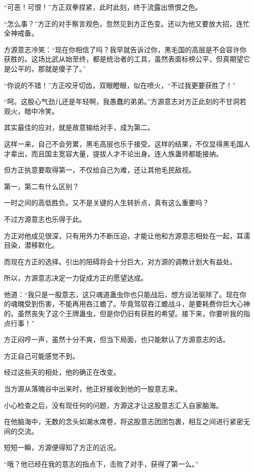\begin{this_body}
“可恶！可恨！”方正双拳捏紧，此时此刻，终于流露出愤恨之色。

“怎么事？”方正的对手察言观色，忽然见到方正色变。还以为他又要放大招，连忙全神戒备。

方源意志冷笑：“现在你相信了吗？我早就告诉过你，黑毛国的高层是不会容许你获胜的。这场比武从始至终，都是统治者的工具，虽然表面标榜公平，但真期望它是公平的，那就是傻子了。”

“你说的不错！”方正咬牙切齿，双眼瞪眼，似在喷火，“不过我更要获胜了！”

“呵。这股心气劲儿还是年轻啊，我愚蠢的弟弟。”方源意志对方正此刻的不甘洞若观火，暗中冷笑。

其实最佳的应对，就是故意输给对手，成为第二。

这样一来，自己不会劳累，黑毛高层也乐于接受。这样的结果，不仅显得黑毛国人才辈出，而且国主宽容大量，提拔人才不论出身。连人族蛊师都能接纳。

但方正执意要取得第一，不仅给自己为难，还让其他毛民敌视。

第一，第二有什么区别？

一时之间的高低胜负。又不是关键的人生转折点，真有这么重要吗？

不过方源意志也乐得于此。

方正对他成见很深，只有用外力不断压迫，才能让他和方源意志相处在一起，耳濡目染，潜移默化。

而现在方正的选择。引出的阻碍将会十分巨大，对方源的调教计划大有益处。

所以，方源意志决定一力促成方正的愿望达成。

他道：“我只是一股意志，这只魂道蛊虫你也只能战后，想方设法驱除了。现在你的魂魄受到伤害，不能再用吞江蟾了。毕竟驾驭吞江蟾战斗，是要耗费你巨大心神的。虽然丧失了这个王牌蛊虫，但是你仍旧有获胜的希望。接下来，你要听我的指点行事！”

方正闷哼一声，虽然十分不爽，但当下局面，也只能默认了方源意志的话。

方正自己可能感觉不到。

经过这些天的相处，他的确正在改变。

当方源从落魄谷中出来时，他正好接收到他的一股意志来。

小心检查之后，没有现任何的问题，方源这才让这股意志汇入自家脑海。

在他脑海中，无数的念头如潮水席卷，将这股意志团团包裹，相互之间进行紧密无间的交流。

短短一瞬，方源便得知了方正的近况。

“哦？他已经在我的意志的指点下，击败了对手，获得了第一么。”


\end{this_body}
